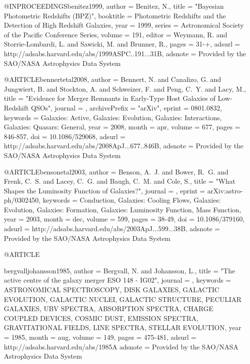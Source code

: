 {{{@INPROCEEDINGS{benitez1999,
   author = {{Benitez}, N.},
    title = "{Bayesian Photometric Redshifts (BPZ)}",
booktitle = {Photometric Redshifts and the Detection of High Redshift Galaxies},
     year = 1999,
   series = {Astronomical Society of the Pacific Conference Series},
   volume = 191,
   editor = {{Weymann}, R. and {Storrie-Lombardi}, L. and {Sawicki}, M. and 
	{Brunner}, R.},
    pages = {31-+},
   adsurl = {http://adsabs.harvard.edu/abs/1999ASPC..191...31B},
  adsnote = {Provided by the SAO/NASA Astrophysics Data System}
}

@ARTICLE{bennertetal2008,
   author = {{Bennert}, N. and {Canalizo}, G. and {Jungwiert}, B. and {Stockton}, A. and 
	{Schweizer}, F. and {Peng}, C.~Y. and {Lacy}, M.},
    title = "{Evidence for Merger Remnants in Early-Type Host Galaxies of Low-Redshift QSOs}",
  journal = {\apj},
archivePrefix = "arXiv",
   eprint = {0801.0832},
 keywords = {Galaxies: Active, Galaxies: Evolution, Galaxies: Interactions, Galaxies: Quasars: General},
     year = 2008,
    month = apr,
   volume = 677,
    pages = {846-857},
      doi = {10.1086/529068},
   adsurl = {http://adsabs.harvard.edu/abs/2008ApJ...677..846B},
  adsnote = {Provided by the SAO/NASA Astrophysics Data System}
}


@ARTICLE{bensonetal2003,
   author = {{Benson}, A.~J. and {Bower}, R.~G. and {Frenk}, C.~S. and {Lacey}, C.~G. and 
	{Baugh}, C.~M. and {Cole}, S.},
    title = "{What Shapes the Luminosity Function of Galaxies?}",
  journal = {\apj},
   eprint = {arXiv:astro-ph/0302450},
 keywords = {Conduction, Galaxies: Cooling Flows, Galaxies: Evolution, Galaxies: Formation, Galaxies: Luminosity Function, Mass Function},
     year = 2003,
    month = dec,
   volume = 599,
    pages = {38-49},
      doi = {10.1086/379160},
   adsurl = {http://adsabs.harvard.edu/abs/2003ApJ...599...38B},
  adsnote = {Provided by the SAO/NASA Astrophysics Data System}
}


@ARTICLE{bergvalljohansson1985,
   author = {{Bergvall}, N. and {Johansson}, L.},
    title = "{The active centre of the galaxy merger ESO 148 - IG02}",
  journal = {\aap},
 keywords = {ASTRONOMICAL SPECTROSCOPY, DISK GALAXIES, GALACTIC EVOLUTION, GALACTIC NUCLEI, GALACTIC STRUCTURE, PECULIAR GALAXIES, UBV SPECTRA, ABSORPTION SPECTRA, CHARGE COUPLED DEVICES, COSMIC DUST, EMISSION SPECTRA, GRAVITATIONAL FIELDS, LINE SPECTRA, STELLAR EVOLUTION},
     year = 1985,
    month = aug,
   volume = 149,
    pages = {475-481},
   adsurl = {http://adsabs.harvard.edu/abs/1985A%
  adsnote = {Provided by the SAO/NASA Astrophysics Data System}
}

}}}}
